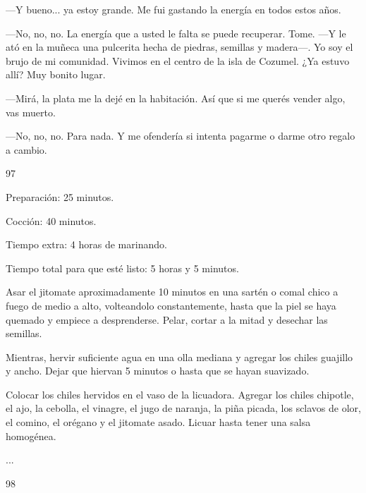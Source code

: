 \documentclass[12pt,twoside,openright,a5paper]{book}
\begin{document}
---Y bueno... ya estoy grande. Me fui gastando la energía en todos estos años.

---No, no, no. La energía que a usted le falta se puede recuperar. Tome. 
---Y le ató en la muñeca una pulcerita hecha de piedras, semillas y madera---.
Yo soy el brujo de mi comunidad. Vivimos en el centro de la isla de
Cozumel. ¿Ya estuvo allí? Muy bonito lugar.

---Mirá, la plata me la dejé en la habitación. Así que si me querés vender
algo, vas muerto.

---No, no, no. Para nada. Y me ofendería si intenta pagarme o darme otro
regalo a cambio.

\vspace{0.5cm}

\hrulefill \hspace{0.1cm}\decofourleft\hspace{0.2cm} 97 \hspace{0.2cm}\decofourright \hspace{0.1cm}\hrulefill

\nopagebreak

\vspace{0.5cm}

\nopagebreak

Preparación: 25 minutos.

Cocción: 40 minutos.

Tiempo extra: 4 horas de marinando.

Tiempo total para que esté listo: 5 horas y 5 minutos.

Asar el jitomate aproximadamente 10 minutos en una sartén o comal chico a 
fuego de medio a alto, volteandolo
constantemente, hasta que la piel se haya quemado y empiece a desprenderse.
Pelar, cortar a la mitad y desechar las semillas.

Mientras, hervir suficiente agua en una olla mediana y agregar los
chiles guajillo y ancho. Dejar que hiervan 5 minutos o hasta que se hayan suavizado.

Colocar los chiles hervidos en el vaso de la licuadora. Agregar los
chiles chipotle, el ajo, la cebolla, el vinagre, el jugo de naranja, la piña picada,
los sclavos de olor, el comino, el orégano y el jitomate asado. Licuar hasta tener una
salsa homogénea.

...

\vspace{0.5cm}

\hrulefill \hspace{0.1cm}\decofourleft\hspace{0.2cm} 98 \hspace{0.2cm}\decofourright \hspace{0.1cm}\hrulefill
\end{document}
